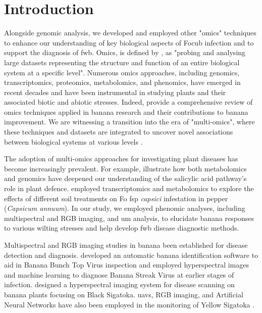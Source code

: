 
\section{Introduction}

Alongside genomic analysis, we developed and employed other "omics" techniques to enhance our understanding of key biological aspects of \ac{Focub} infection and to support the diagnosis of \ac{fwb}. Omics, is defined by \textcite{Dai2022}, as "probing and analysing large datasets representing the structure and function of an entire biological system at a specific level". Numerous omics approaches, including genomics, transcriptomics, proteomics, metabolomics, and phenomics, have emerged in recent decades and have been instrumental in studying plants and their associated biotic and abiotic stresses. Indeed, \textcite{Backiyarani2022} provide a comprehensive review of omics techniques applied in banana research and their contributions to banana improvement. We are witnessing a transition into the era of "multi-omics", where these techniques and datasets are integrated to uncover novel associations between biological systems at various levels \parencite{Hasin2017}.

The adoption of multi-omics approaches for investigating plant diseases has become increasingly prevalent. For example, \textcite{Crandall2020} illustrate how both metabolomics and genomics have deepened our understanding of the salicylic acid pathway's role in plant defence. \textcite{Zhu2021} employed transcriptomics and metabolomics to explore the effects of different soil treatments on \ac{Fo} \ac{fsp} \textit{capsici} infestation in pepper (\textit{Capsicum annuum}). In our study, we employed phenomic analyses, including multispectral and RGB imaging, and \acf{um} analysis, to elucidate banana responses to various wilting stresses and help develop \ac{fwb} disease diagnostic methods.


Multispectral and RGB imaging studies in banana been established for disease detection and diagnosis. \textcite{Johansen2014} developed an automatic banana identification software to aid in Banana Bunch Top Virus inspection and \textcite{Liao2018} employed hyperspectral images and machine learning to diagnose Banana Streak Virus at earlier stages of infection. \textcite{Ochoa2016} designed a hyperspectral imaging system for disease scanning on banana plants focusing on Black Sigatoka. \acp{uav}, RGB imaging, and Artificial Neural Networks have also been employed in the monitoring of Yellow Sigatoka \parencite{Calou2020}.  


